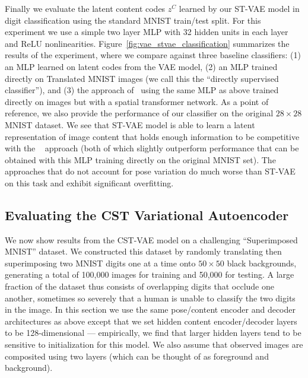 Finally we evaluate the latent content codes $z^C$ learned by our ST-VAE model 
in digit classification using the standard MNIST train/test split.  For this experiment
we use a simple two layer MLP with 32 hidden units in each layer and ReLU nonlinearities.
Figure~\ref{fig:vae_stvae_classification} summarizes the results of the experiment, where we
compare against three baseline classifiers: (1) an MLP learned on latent codes from the VAE model,
(2) an MLP trained directly on Translated MNIST images (we call this the ``directly supervised classifier''), 
and (3) the approach of~\cite{jaderberg2015spatial} using the same MLP as above trained directly
on images but with a spatial transformer network.
As a point of reference, we also provide the performance of our classifier on the original $28\times 28$ MNIST
dataset.  We see that ST-VAE model is able to learn a latent representation of image content that holds enough information
to be competitive with the ~\cite{jaderberg2015spatial} approach (both of which slightly outperform performance
that can be obtained with this MLP training directly on the original MNIST set).  The approaches that do not account for
pose variation do much worse than ST-VAE on this task and exhibit significant overfitting.


\subsection{Evaluating the CST Variational Autoencoder}


We now show results from the CST-VAE model on a challenging ``Superimposed MNIST'' dataset.
We constructed this dataset
by randomly translating then superimposing two MNIST digits one at a time onto $50\times 50$ black backgrounds,
generating a total of 100,000 images for training and 50,000 for testing.  
A large fraction of the dataset thus consists of overlapping digits that occlude one another, sometimes so severely that
a human is unable to classify the two digits in the image.
In this section we use the same pose/content encoder and decoder
architectures as above except that we set hidden content encoder/decoder layers to be 128-dimensional --- empirically,
we find that larger hidden layers tend to be sensitive to initialization for this model.
We also assume that observed images are composited
using two layers (which can be thought of as foreground and background).

